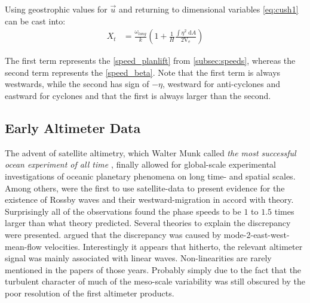 Using geostrophic values for $\vec{u}$ and returning to dimensional variables \eqref{eq:cush1} can be cast into:
\begin{equation}\begin{split}
	X_t
	&=
	\frac{\omega_{long}}{k} \left(1 +\frac{1}{H} \frac{ \int  \eta^2 \; \mathrm{d}A	}{2\mathrm{V_e}} \right)
\end{split}\end{equation}

The first term represents the \ref{speed_planlift} from \ref{subsec:speeds}, whereas the second term represents the \ref{speed_beta}. Note that the first term is always westwards, while the second has sign of $-\eta$, \ie westward for anti-cyclones and eastward for cyclones and that the first is always larger than the second.

\subsection{Early Altimeter Data}\label{sec:hist_killworth}
The advent of satellite altimetry, which Walter Munk called \textit{the most successful ocean experiment of all time \citet{Munk2002}}, finally allowed for
global-scale experimental investigations of oceanic planetary phenomena on long time- and spatial scales. Among others,
\citet{matano1993seasonal,cipollini1997concurrent,le1993sea} were the first to use satellite-data to present evidence for the existence of Rossby waves and their
westward-migration in accord with theory. Surprisingly all of the observations found the phase speeds to be $1$ to $1.5$ times larger than what theory
predicted. Several theories to explain the discrepancy were presented. \Eg \citet{Killworth1997a} argued that the discrepancy was caused by
mode-2-east-west-mean-flow velocities. Interestingly it appears that hitherto, the relevant altimeter signal was mainly associated with linear waves.
Non-linearities are rarely mentioned in the papers of those years. Probably simply due to the fact that the turbulent character of much of the
meso-scale variability was still obscured by the poor resolution of the first altimeter products.

